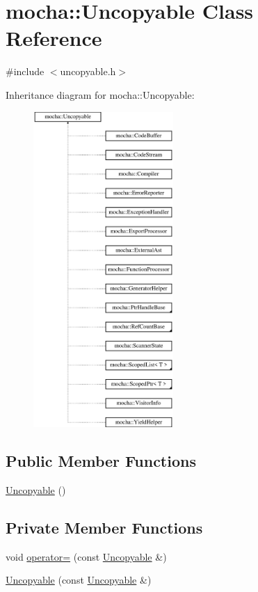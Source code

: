 \hypertarget{classmocha_1_1_uncopyable}{
\section{mocha::Uncopyable Class Reference}
\label{classmocha_1_1_uncopyable}
}


{\ttfamily \#include $<$uncopyable.h$>$}

Inheritance diagram for mocha::Uncopyable:\begin{figure}[H]
\begin{center}
\leavevmode
\includegraphics[height=12.000000cm]{classmocha_1_1_uncopyable}
\end{center}
\end{figure}
\subsection*{Public Member Functions}
\begin{DoxyCompactItemize}
\item 
\hyperlink{classmocha_1_1_uncopyable_a1682d5e1ee1a64a14b39d31c48202b01}{Uncopyable} ()
\end{DoxyCompactItemize}
\subsection*{Private Member Functions}
\begin{DoxyCompactItemize}
\item 
void \hyperlink{classmocha_1_1_uncopyable_ac20fababfa9637eb24479b6d4e2010a7}{operator=} (const \hyperlink{classmocha_1_1_uncopyable}{Uncopyable} \&)
\item 
\hyperlink{classmocha_1_1_uncopyable_a37849d520c1ca09d3abdb9e42f78a2e2}{Uncopyable} (const \hyperlink{classmocha_1_1_uncopyable}{Uncopyable} \&)
\end{DoxyCompactItemize}



